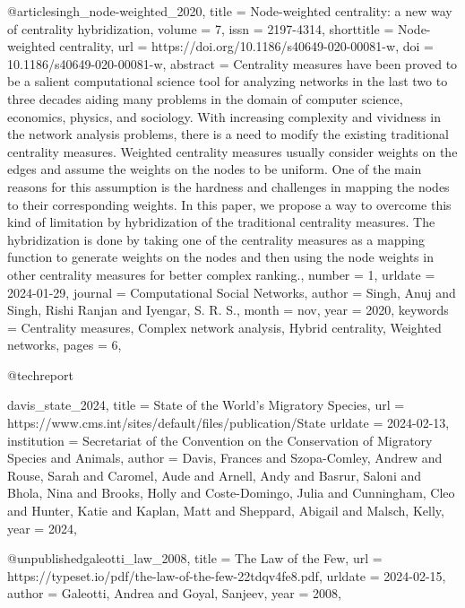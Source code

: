 {{{@article{singh_node-weighted_2020,
	title = {Node-weighted centrality: a new way of centrality hybridization},
	volume = {7},
	issn = {2197-4314},
	shorttitle = {Node-weighted centrality},
	url = {https://doi.org/10.1186/s40649-020-00081-w},
	doi = {10.1186/s40649-020-00081-w},
	abstract = {Centrality measures have been proved to be a salient computational science tool for analyzing networks in the last two to three decades aiding many problems in the domain of computer science, economics, physics, and sociology. With increasing complexity and vividness in the network analysis problems, there is a need to modify the existing traditional centrality measures. Weighted centrality measures usually consider weights on the edges and assume the weights on the nodes to be uniform. One of the main reasons for this assumption is the hardness and challenges in mapping the nodes to their corresponding weights. In this paper, we propose a way to overcome this kind of limitation by hybridization of the traditional centrality measures. The hybridization is done by taking one of the centrality measures as a mapping function to generate weights on the nodes and then using the node weights in other centrality measures for better complex ranking.},
	number = {1},
	urldate = {2024-01-29},
	journal = {Computational Social Networks},
	author = {Singh, Anuj and Singh, Rishi Ranjan and Iyengar, S. R. S.},
	month = nov,
	year = {2020},
	keywords = {Centrality measures, Complex network analysis, Hybrid centrality, Weighted networks},
	pages = {6},
}

@techreport{davis_state_2024,
	title = {State of the {World}'s {Migratory} {Species}},
	url = {https://www.cms.int/sites/default/files/publication/State%
	urldate = {2024-02-13},
	institution = {Secretariat of the Convention on the Conservation of Migratory Species and Animals},
	author = {Davis, Frances and Szopa-Comley, Andrew and Rouse, Sarah and Caromel, Aude and Arnell, Andy and Basrur, Saloni and Bhola, Nina and Brooks, Holly and Coste-Domingo, Julia and Cunningham, Cleo and Hunter, Katie and Kaplan, Matt and Sheppard, Abigail and Malsch, Kelly},
	year = {2024},
}

@unpublished{galeotti_law_2008,
	title = {The {Law} of the {Few}},
	url = {https://typeset.io/pdf/the-law-of-the-few-22tdqv4fe8.pdf},
	urldate = {2024-02-15},
	author = {Galeotti, Andrea and Goyal, Sanjeev},
	year = {2008},
}

}}}}
